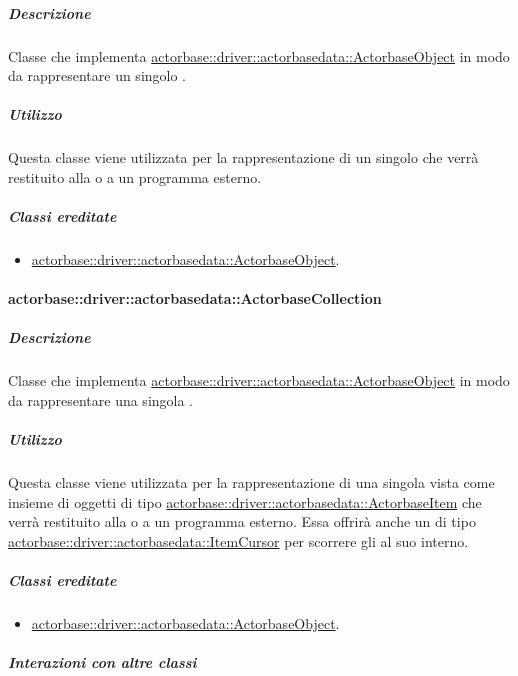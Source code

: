 \documentclass{scalatekids-article}
\begin{document}
\subparagraph{Descrizione}

Classe che implementa \hyperref[sec:actorbase::driver::actorbasedata::ActorbaseObject]{actorbase::driver::actorbasedata::ActorbaseObject}
in modo da rappresentare un singolo .

\subparagraph{Utilizzo}

Questa classe viene utilizzata per la rappresentazione di un singolo
 che verrà restituito alla  o a un programma esterno.

\subparagraph{Classi ereditate}

\begin{itemize}
\item \hyperref[sec:actorbase::driver::actorbasedata::ActorbaseObject]{actorbase::driver::actorbasedata::ActorbaseObject}.
\end{itemize}

\paragraph{actorbase::driver::actorbasedata::ActorbaseCollection}
\label{sec:actorbase::driver::actorbasedata::ActorbaseCollection}

\subparagraph{Descrizione}

Classe che implementa \hyperref[sec:actorbase::driver::actorbasedata::ActorbaseObject]{actorbase::driver::actorbasedata::ActorbaseObject}
in modo da rappresentare una singola .

\subparagraph{Utilizzo}

Questa classe viene utilizzata per la rappresentazione di una singola
 vista come insieme di oggetti di tipo
\hyperref[sec:actorbase::driver::actorbasedata::ActorbaseItem]{actorbase::driver::actorbasedata::ActorbaseItem}
che verrà restituito alla  o a un programma esterno.
Essa offrirà anche un  di tipo
\hyperref[sec:actorbase::driver::actorbasedata::ItemCursor]{actorbase::driver::actorbasedata::ItemCursor}
per scorrere gli  al suo interno.

\subparagraph{Classi ereditate}

\begin{itemize}
\item \hyperref[sec:actorbase::driver::actorbasedata::ActorbaseObject]{actorbase::driver::actorbasedata::ActorbaseObject}.
\end{itemize}

\subparagraph{Interazioni con altre classi}
\end{document}
